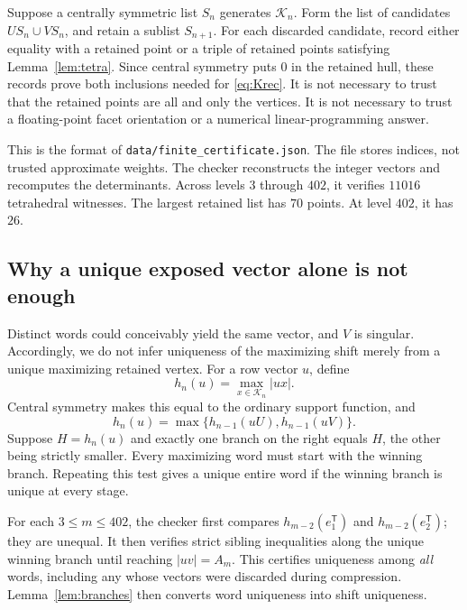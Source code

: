 \documentclass[11pt,a4paper]{article}
\theoremstyle{definition}\newtheorem{definition}[theorem]{Definition}
\theoremstyle{remark}\newtheorem{remark}[theorem]{Remark}
\newcommand{\tr}{\mathsf T}
\newcommand{\cK}{\mathcal K}
\begin{document}
Suppose a centrally symmetric list $S_n$ generates $\cK_n$. Form the list of
candidates $US_n\cup VS_n$, and retain a sublist $S_{n+1}$. For each discarded
candidate, record either equality with a retained point or a triple of
retained points satisfying Lemma~\ref{lem:tetra}. Since central symmetry puts
$0$ in the retained hull, these records prove both inclusions needed for
\eqref{eq:Krec}. It is not necessary to trust that the retained points are all
and only the vertices. It is not necessary to trust a floating-point facet
orientation or a numerical linear-programming answer.

This is the format of \texttt{data/finite\_certificate.json}. The file stores
indices, not trusted approximate weights. The checker reconstructs the
integer vectors and recomputes the determinants. Across levels $3$ through
$402$, it verifies $11016$ tetrahedral witnesses. The largest retained list
has $70$ points. At level $402$, it has $26$.

\subsection{Why a unique exposed vector alone is not enough}
Distinct words could conceivably yield the same vector, and $V$ is singular.
Accordingly, we do not infer uniqueness of the maximizing shift merely from
a unique maximizing retained vertex.
For a row vector $u$, define
\[
 h_n(u)=\max_{x\in\cK_n}|ux|.
\]
Central symmetry makes this equal to the ordinary support function, and
\begin{equation}
 h_n(u)=\max\{h_{n-1}(uU),h_{n-1}(uV)\}.
 \label{eq:support}
\end{equation}
Suppose $H=h_n(u)$ and exactly one branch on the right equals $H$, the other
being strictly smaller. Every maximizing word must start with the winning
branch. Repeating this test gives a unique entire word if the winning branch
is unique at every stage.

For each $3\le m\le402$, the checker first compares
$h_{m-2}(e_1^\tr)$ and $h_{m-2}(e_2^\tr)$; they are unequal. It then verifies
strict sibling inequalities along the unique winning branch until reaching
$|uv|=A_m$. This certifies uniqueness among \emph{all} words, including any
whose vectors were discarded during compression. Lemma~\ref{lem:branches}
then converts word uniqueness into shift uniqueness.
\end{document}
